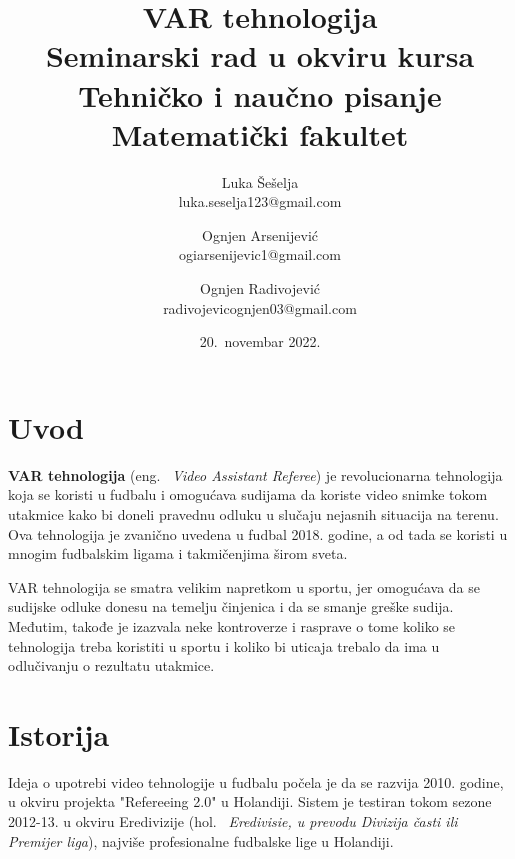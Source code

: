 \documentclass[a4paper]{article}
\begin{document}
\title{VAR tehnologija\\ \small{Seminarski rad u okviru kursa\\Tehničko i naučno pisanje\\ Matematički fakultet}}

\author{Luka Šešelja\\ luka.seselja123@gmail.com \and Ognjen Arsenijević\\ ogiarsenijevic1@gmail.com \and Ognjen Radivojević\\ radivojevicognjen03@gmail.com}
\date{20.~novembar 2022.}
\maketitle

\begin{abstract}
    
\end{abstract}

\tableofcontents

\newpage

\section{Uvod}
\textbf{VAR tehnologija} (eng. ~{\em Video Assistant Referee}) je revolucionarna tehnologija koja se koristi u fudbalu i omogućava sudijama da koriste video snimke tokom utakmice kako bi doneli pravednu odluku u slučaju nejasnih situacija na terenu. Ova tehnologija je  zvanično uvedena u fudbal 2018. godine, a od tada se koristi u mnogim fudbalskim ligama i takmičenjima širom sveta.

VAR tehnologija se smatra velikim napretkom u sportu, jer omogućava da se sudijske odluke donesu na temelju činjenica i da se smanje greške sudija. Međutim, takođe je izazvala neke kontroverze i rasprave o tome koliko se tehnologija treba koristiti u sportu i koliko bi uticaja trebalo da ima u odlučivanju o rezultatu utakmice.

\section{Istorija}
Ideja o upotrebi video tehnologije u fudbalu počela je da se razvija 2010. godine, u okviru projekta "Refereeing 2.0" u Holandiji. \cite{istorija} Sistem je testiran tokom sezone 2012-13. u okviru Eredivizije (hol. ~{\em Eredivisie, u prevodu Divizija časti ili Premijer liga}), najviše profesionalne fudbalske lige u Holandiji.
\end{document}
